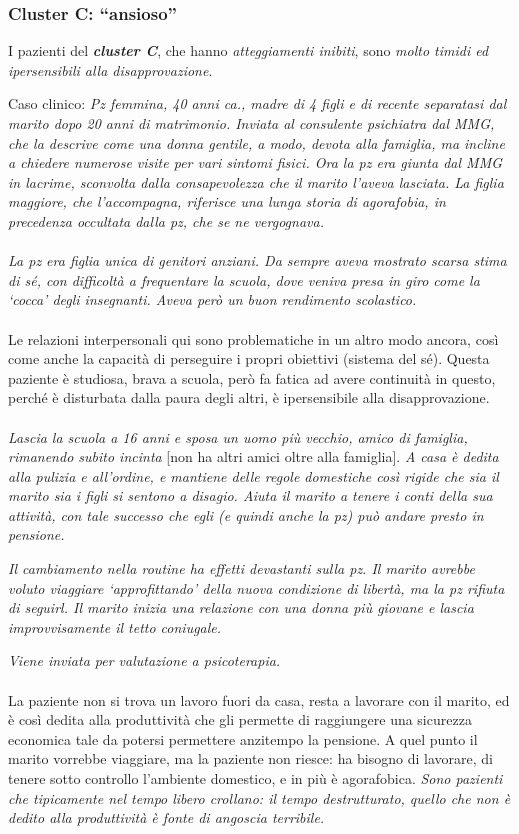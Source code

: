 \subsubsection{Cluster C: ``ansioso''}

I pazienti del \textbf{\emph{cluster C}}, che hanno \emph{atteggiamenti
inibiti}, sono \emph{molto timidi ed ipersensibili alla
disapprovazione}.

Caso clinico: \emph{Pz femmina, 40 anni ca., madre di 4 figli e di
recente separatasi dal marito dopo 20 anni di matrimonio. Inviata al
consulente psichiatra dal MMG, che la descrive come una donna gentile, a
modo, devota alla famiglia, ma incline a chiedere numerose visite per
vari sintomi fisici. Ora la pz era giunta dal MMG in lacrime, sconvolta
dalla consapevolezza che il marito l'aveva lasciata. La figlia maggiore,
che l'accompagna, riferisce una lunga storia di agorafobia, in
precedenza occultata dalla pz, che se ne vergognava.}
\\\\
\emph{La pz era figlia unica di genitori anziani. Da sempre aveva
mostrato scarsa stima di sé, con difficoltà a frequentare la scuola,
dove veniva presa in giro come la `cocca' degli insegnanti. Aveva però
un buon rendimento scolastico.}
\\\\
Le relazioni interpersonali qui sono problematiche in un altro modo
ancora, così come anche la capacità di perseguire i propri obiettivi
(sistema del sé). Questa paziente è studiosa, brava a scuola, però fa
fatica ad avere continuità in questo, perché è disturbata dalla paura
degli altri, è ipersensibile alla disapprovazione.
\\\\
\emph{Lascia la scuola a 16 anni e sposa un uomo più vecchio, amico di
famiglia, rimanendo subito incinta} {[}non ha altri amici oltre alla
famiglia{]}. \emph{A casa è dedita alla pulizia e all'ordine, e mantiene
delle regole domestiche così rigide che sia il marito sia i figli si
sentono a disagio. Aiuta il marito a tenere i conti della sua attività,
con tale successo che egli (e quindi anche la pz) può andare presto in
pensione. }

\emph{Il cambiamento nella routine ha effetti devastanti sulla pz. Il
marito avrebbe voluto viaggiare `approfittando' della nuova condizione
di libertà, ma la pz rifiuta di seguirl. Il marito inizia una relazione
con una donna più giovane e lascia improvvisamente il tetto coniugale.}

\emph{Viene inviata per valutazione a psicoterapia.}
\\\\
La paziente non si trova un lavoro fuori da casa, resta a lavorare con
il marito, ed è così dedita alla produttività che gli permette di
raggiungere una sicurezza economica tale da potersi permettere anzitempo
la pensione. A quel punto il marito vorrebbe viaggiare, ma la paziente
non riesce: ha bisogno di lavorare, di tenere sotto controllo l'ambiente
domestico, e in più è agorafobica. \emph{Sono pazienti che tipicamente
nel tempo libero crollano: il tempo destrutturato, quello che non è
dedito alla produttività è fonte di angoscia terribile. }

